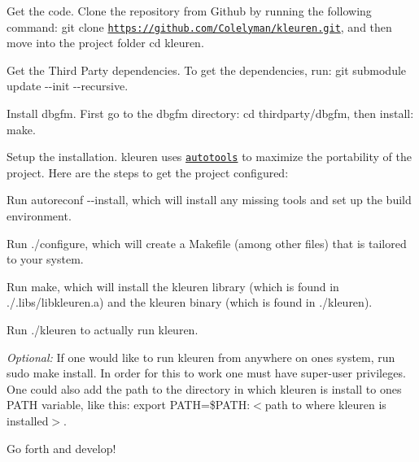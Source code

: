 \begin{DoxyEnumerate}
\item Get the code. Clone the repository from Github by running the following command\+: {\ttfamily git clone \href{https://github.com/Colelyman/kleuren.git}{\tt https\+://github.\+com/\+Colelyman/kleuren.\+git}}, and then move into the project folder {\ttfamily cd kleuren}.
\item Get the Third Party dependencies. To get the dependencies, run\+: {\ttfamily git submodule update -\/-\/init -\/-\/recursive}.
\begin{DoxyEnumerate}
\item Install {\ttfamily dbgfm}. First go to the {\ttfamily dbgfm} directory\+: {\ttfamily cd thirdparty/dbgfm}, then install\+: {\ttfamily make}.
\end{DoxyEnumerate}
\item Setup the installation. {\ttfamily kleuren} uses \href{https://www.gnu.org/software/automake/manual/html_node/Autotools-Introduction.html}{\tt autotools} to maximize the portability of the project. Here are the steps to get the project configured\+:
\begin{DoxyEnumerate}
\item Run {\ttfamily autoreconf -\/-\/install}, which will install any missing tools and set up the build environment.
\item Run {\ttfamily ./configure}, which will create a {\ttfamily Makefile} (among other files) that is tailored to your system.
\item Run {\ttfamily make}, which will install the {\ttfamily kleuren} library (which is found in {\ttfamily ./.libs/libkleuren.\+a}) and the kleuren binary (which is found in {\ttfamily ./kleuren}).
\item Run {\ttfamily ./kleuren} to actually run {\ttfamily kleuren}.
\end{DoxyEnumerate}
\item {\itshape Optional\+:} If one would like to run {\ttfamily kleuren} from anywhere on one\textquotesingle{}s system, run {\ttfamily sudo make install}. In order for this to work one must have super-\/user privileges. One could also add the path to the directory in which {\ttfamily kleuren} is install to one\textquotesingle{}s {\ttfamily P\+A\+TH} variable, like this\+: {\ttfamily export P\+A\+TH=\$\+P\+A\+TH\+:$<$path to where kleuren is installed$>$}.
\item Go forth and develop!
\end{DoxyEnumerate}

